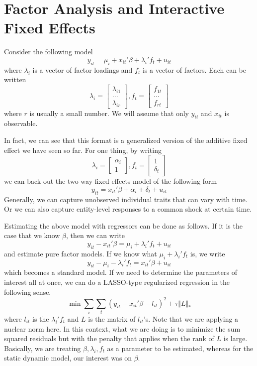 \documentclass[12pt]{article}
\theoremstyle{definition}
\theoremstyle{property}
\theoremstyle{assumption}
\theoremstyle{example}
\theoremstyle{comment}
\begin{document}
\section{Factor Analysis and Interactive Fixed Effects}
Consider the following model
\[
y_{it}=\mu_i+x_{it}'\beta + \lambda_i'f_t + u_{it}
\]
where $\lambda_i$ is a vector of factor loadings and $f_t$ is a vector of factors. Each can be written
\[
\lambda_i = \begin{bmatrix}\lambda_{i1}\\ ... \\ \lambda_{ir} \end{bmatrix}, f_t = \begin{bmatrix}f_{1t}\\ ... \\ f_{rt} \end{bmatrix}
\]
where $r$ is usually a small number. We will assume that only $y_{it}$ and $x_{it}$ is observable. \par
In fact, we can see that this format is a generalized version of the additive fixed effect we have seen so far. For one thing, by writing
\[
\lambda_i = \begin{bmatrix}\alpha_{i}\\1 \end{bmatrix}, f_t = \begin{bmatrix}1\\\delta_{t} \end{bmatrix}
\]
we can back out the two-way fixed effects model of the following form
\[
y_{it}=x_{it}'\beta + \alpha_i+\delta_t + u_{it}
\]
Generally, we can capture unobserved individual traits that can vary with time. Or we can also capture entity-level responses to a common shock at certain time. \par
Estimating the above model with regressors can be done as follows. If it is the case that we know $\beta$, then we can write
\[
y_{it}-x_{it}'\beta = \mu_i+\lambda_i'f_t + u_{it}
\]
and estimate pure factor models. If we know what $\mu_i + \lambda_i'f_t$ is, we write
\[
y_{it}-\mu_i-\lambda_i'f_t = x_{it}'\beta+u_{it}
\]
which becomes a standard model. If we need to determine the parameters of interest all at once, we can do a LASSO-type regularized regression in the following sense. 
\[
\min \sum_i \sum_t (y_{it}-x_{it}'\beta-l_{it})^2 + \tau\Vert L \Vert_*
\]
where $l_{it}$ is the $\lambda_i'f_t$ and $L$ is the matrix of $l_{it}$'s. Note that we are applying a nuclear norm here. In this context, what we are doing is to minimize the sum squared residuals but with the penalty that applies when the rank of $L$ is large. Basically, we are treating $\beta, \lambda_i, f_t$ as a parameter to be estimated, whereas for the static dynamic model, our interest was on $\beta$. \par
\end{document}
